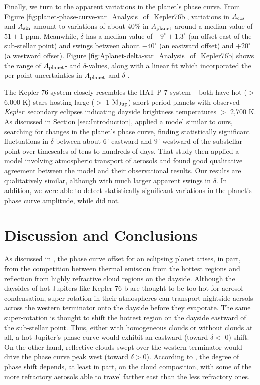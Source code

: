 \documentclass[manuscript]{aastex62}
\newcommand{\kepler}{{\it Kepler}}
\begin{document}
Finally, we turn to the apparent variations in the planet's phase curve. From Figure \ref{fig:planet-phase-curve-var_Analysis_of_Kepler76b}, variations in $A_{\rm cos}$ and $A_{\rm sin}$ amount to variations of about 40\% in $A_{\rm planet}$ around a median value of $51 \pm 1$ ppm. Meanwhile, $\delta$ has a median value of $-9^\circ \pm 1.3^\circ$ (an offset east of the sub-stellar point) and swings between about $-40^\circ$ (an eastward offset) and $+20^\circ$ (a westward offset). Figure \ref{fig:Aplanet-delta-var_Analysis_of_Kepler76b} shows the range of $A_{\rm planet}$- and $\delta$-values, along with a linear fit which incorporated the per-point uncertainties in $A_{\rm planet}$ and $\delta$ \citep{boggs1990orthogonal}.

The Kepler-76 system closely resembles the HAT-P-7 system -- both have hot ($>$ 6,000 K) stars hosting large ($>$ 1 ${\rm M_{Jup}}$) short-period planets with observed \kepler\ secondary eclipses indicating dayside brightness temperatures $>$ 2,700 K. As discussed in Section \ref{sec:Introduction}, \citet{2016NatAs...1E...4A} applied a model similar to ours, searching for changes in the planet's phase curve, finding statistically significant fluctuations in $\delta$ between about $6^\circ$ eastward and $9^\circ$ westward of the substellar point over timescales of tens to hundreds of days. That study then applied a model involving atmospheric transport of aerosols and found good qualitative agreement between the model and their observational results. Our results are qualitatively similar, although with much larger apparent swings in $\delta$. In addition, we were able to detect statistically significant variations in the planet's phase curve amplitude, while \citet{2016NatAs...1E...4A} did not.

\section{Discussion and Conclusions}
\label{sec:Discussion}


As discussed in \citet{2016ApJ...828...22P}, the phase curve offset for an eclipsing planet arises, in part, from the competition between thermal emission from the hottest regions and reflection from highly refractive cloud regions on the dayside. Although the daysides of hot Jupiters like Kepler-76 b are thought to be too hot for aerosol condensation, super-rotation in their atmospheres can transport nightside aersols across the western terminator onto the dayside before they evaporate. The same super-rotation is thought to shift the hottest region on the dayside eastward of the sub-stellar point. Thus, either with homogeneous clouds or without clouds at all, a hot Jupiter's phase curve would exhibit an eastward (toward $\delta <$ 0) shift. On the other hand, reflective clouds swept over the western terminator would drive the phase curve peak west (toward $\delta > 0$). According to \citet{2016ApJ...828...22P}, the degree of phase shift depends, at least in part, on the cloud composition, with some of the more refractory aerosols able to travel farther east than the less refractory ones. 
\end{document}
